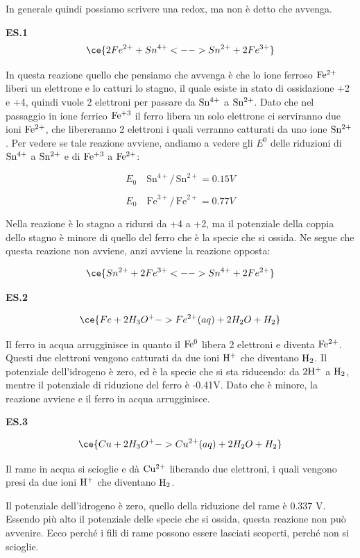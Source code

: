 In generale quindi possiamo scrivere una redox, ma non è detto che avvenga.

\vspace{0.2cm}\textbf{ES.1}
$$\ce{2Fe^{2+} + Sn^{4+} <--> Sn^{2+} + 2Fe^{3+}}$$

In questa reazione quello che pensiamo che avvenga è che lo ione ferroso $\rm Fe^{2+}$ liberi un elettrone e lo catturi lo stagno, il quale esiste in stato di ossidazione +2 e +4, quindi vuole 2 elettroni per passare da $\rm Sn^{4+}$ a $\rm Sn^{2+}$. Dato che nel passaggio in ione ferrico $\rm Fe^{+3}$ il ferro libera un solo elettrone ci serviranno due ioni $\rm Fe^{2+}$, che libereranno 2 elettroni i quali verranno catturati da uno ione $\rm Sn^{2+}$. Per vedere se tale reazione avviene, andiamo a vedere gli $E^0$ delle riduzioni di $\rm Sn^{4+}$ a $\rm Sn^{2+}$ e di $\rm Fe^{+3}$ a $\rm Fe^{2+}$:

$$E_0 \quad \text{Sn}^{4+}/ \, \text{Sn}^{2+}=0.15 V$$

\vspace{-0.3cm}$$E_0 \quad \text{Fe}^{3+}/ \, \text{Fe}^{2+}=0.77 V$$

Nella reazione è lo stagno a ridursi da +4 a +2, ma il potenziale della coppia dello stagno è minore di quello del ferro che è la specie che si ossida. Ne segue che questa reazione non avviene, anzi avviene la reazione opposta:

$$\ce{Sn^{2+} + 2Fe^{3+} <--> Sn^{4+} + 2Fe^{2+}}$$

\textbf{ES.2}

$$\ce{Fe +2H_3O^+ -> Fe^{2+}(aq) + 2H_2O + H_2}$$

Il ferro in acqua arrugginisce in quanto il $\rm Fe^0$ libera 2 elettroni e diventa $\rm Fe^{2+}$. Questi due elettroni vengono catturati da due ioni $\rm H^+$ che diventano $\rm H_2$. Il potenziale dell'idrogeno è zero, ed è la specie che si sta riducendo: da $\rm 2H^+$ a $\rm H_2$, mentre il potenziale di riduzione del ferro è -0.41V. Dato che è minore, la reazione avviene e il ferro in acqua arrugginisce.

\vspace{0.2cm}\textbf{ES.3}

$$\ce{Cu +2H_3O^+ -> Cu^{2+}(aq) + 2H_2O + H_2}$$

Il rame in acqua si scioglie e dà $\rm Cu^{2+}$ liberando due elettroni, i quali vengono presi da due ioni $\rm H^+$ che diventano $\rm H_2$.

Il potenziale dell'idrogeno è zero, quello della riduzione del rame è 0.337 V. Essendo più alto il potenziale delle specie che si ossida, questa reazione non può avvenire. Ecco perché i fili di rame possono essere lasciati scoperti, perché non si scioglie.

